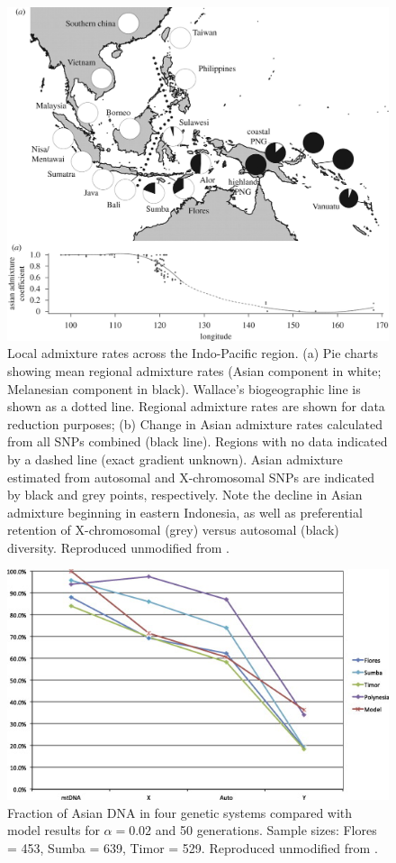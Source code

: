 \documentclass[a4paper,12pt]{report}
\begin{document}
\begin{figure}[!ht]
	\centering
	\includegraphics[width=1\textwidth]{../data/cox-image.jpg}
	\caption{Local admixture rates across the Indo-Pacific region. (a) Pie charts showing mean regional admixture rates (Asian component in white; Melanesian component in black). Wallace's biogeographic line is shown as a dotted line. Regional admixture rates are shown for data reduction purposes; (b) Change in Asian admixture rates calculated from all SNPs combined (black line). Regions with no data indicated by a dashed line (exact gradient unknown). Asian admixture estimated from autosomal and X-chromosomal SNPs are indicated by black and grey points, respectively. Note the decline in Asian admixture beginning in eastern Indonesia, as well as preferential retention of X-chromosomal (grey) versus autosomal (black) diversity. Reproduced unmodified from \cite{Cox01}.}
	\label{cox-image}
\end{figure}

\begin{figure}[!htbp]
	\centering
	\includegraphics[width=1\textwidth]{../data/lansing-image.jpg}
	\caption{Fraction of Asian DNA in four genetic systems compared with model results for $\alpha = 0.02$ and 50 generations. Sample sizes: Flores = 453, Sumba = 639, Timor = 529. Reproduced unmodified from \cite{Lan01}.}
	\label{lansing-image}
\end{figure}
\end{document}
